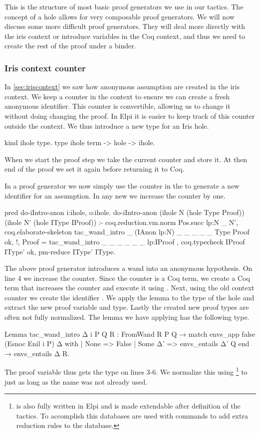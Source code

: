 \documentclass[thesis.tex]{subfiles}
\begin{document}
{{{{This is the structure of most basic proof generators we use in our tactics. The concept of a hole allows for very composable proof generators. We will now discuss some more difficult proof generators. They will deal more directly with the iris context or introduce variables in the Coq context, and thus we need to create the rest of the proof under a binder.

\subsubsection{Iris context counter}\label{ssec:cecontextcounter}
In \cref{sec:iriscontext} we saw how anonymous assumption are created in the iris context. We keep a counter in the context to ensure we can create a fresh anonymous identifier. This counter is convertible, allowing us to change it without doing changing the proof. In Elpi it is easier to keep track of this counter outside the context. We thus introduce a new type for an Iris hole.
\begin{elpicode}
  kind ihole type.
  type ihole term -> hole -> ihole. %
\end{elpicode}
When we start the proof step we take the current counter and store it. At then end of the proof we set it again before returning it to Coq.

In a proof generator we now simply use the counter in the  to generate a new identifier for an assumption. In any new  we increase the counter by one.
\begin{elpicode}
  pred do-iIntro-anon i:ihole, o:ihole.
  do-iIntro-anon (ihole N (hole Type Proof)) 
                 (ihole N' (hole IType IProof)) :-
    coq.reduction.vm.norm {{ Pos.succ lp:N }} _ N',
    coq.elaborate-skeleton 
      {{ tac_wand_intro _ (IAnon lp:N) _ _ _ _ _ }} 
      Type Proof ok, !,
    Proof = {{ tac_wand_intro _ _ _ _ _ _ lp:IProof }}, 
    coq.typecheck IProof IType' ok,
    pm-reduce IType' IType.
\end{elpicode}
The above proof generator introduces a wand into an anonymous hypothesis. On line 4 we increase the counter. Since the counter is a Coq term, we create a Coq term that increases the counter and execute it using . Next, using the old context counter we create the identifier . We apply the lemma to the type of the hole and extract the new proof variable and type. Lastly the created new proof types are often not fully normalized. The lemma we have applying has the following type.
\begin{coqcode}
  Lemma tac_wand_intro Δ i P Q R :
    FromWand R P Q →
    match envs_app false (Esnoc Enil i P) Δ with
    | None => False
    | Some Δ' => envs_entails Δ' Q
    end →
    envs_entails Δ R.
\end{coqcode}
The proof variable thus gets the type on lines 3-6. We normalize this using \footnote{ is also fully written in Elpi and is made extendable after definition of the tactics. To accomplish this \ce databases are used with commands to add extra reduction rules to the database.} to just  as long as the name was not already used.


}}}}
\end{document}
